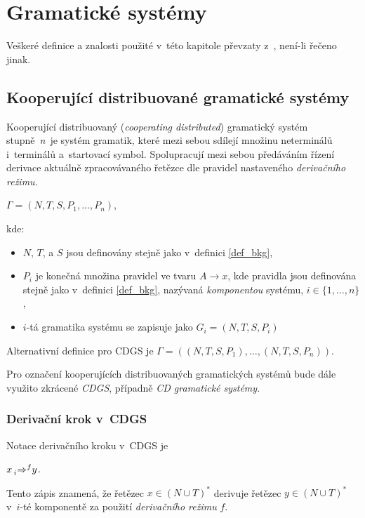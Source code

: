 \chapter{Gramatické systémy}\label{kap_GS}
Veškeré definice a znalosti použité v~této kapitole převzaty z~\cite{CDGS, PCGS, Handbook-Of-Formal-Languages-2}, není-li řečeno jinak.

\section{Kooperující distribuované gramatické systémy}\label{kap_CDGS}

Kooperující distribuovaný (\emph{cooperating distributed}) gramatický systém stupně~\emph{n}~je systém gramatik, které mezi sebou sdílejí množinu neterminálů i~terminálů a~startovací symbol.
Spolupracují mezi sebou předáváním řízení derivace aktuálně zpracovávaného řetězce dle pravidel nastaveného \emph{derivačního režimu}.

\begin{definition}\label{def_cdgs}
\begin{center}
    $\Gamma = (N, T, S, P_1, \ldots ,P_n)$,
\end{center}
kde:
\begin{itemize}
    \item $N$, $T$, a $S$ jsou definovány stejně jako v~definici \ref{def_bkg},
    \item $P_i$ je konečná množina pravidel ve tvaru $A\rightarrow x$, kde pravidla jsou definována stejně jako v~definici \ref{def_bkg}, nazývaná \emph{komponentou} systému, $i \in \{1, \ldots, n\}$,
    \item $i$-tá gramatika systému se zapisuje jako $G_i = (N,T,S,P_i)$
\end{itemize}   
Alternativní definice pro CDGS je $\Gamma = ((N, T, S, P_1), \ldots , (N, T, S, P_n))$.
\end{definition}

\begin{convention}
    Pro označení kooperujících distribuovaných gramatických systémů bude dále využito zkrácené \emph{CDGS}, případně \emph{CD gramatické systémy}.
\end{convention}

\subsection*{Derivační krok v~CDGS}
Notace derivačního kroku v~CDGS je
\begin{center}
    $x \prescript{}{i}{\Rightarrow}^{f} y$.
\end{center}
Tento zápis znamená, že řetězec $x \in (N \cup T)^{*}$ derivuje řetězec $y \in (N \cup T)^{*}$ v~$i$-té komponentě za použití \emph{derivačního režimu} $f$.


